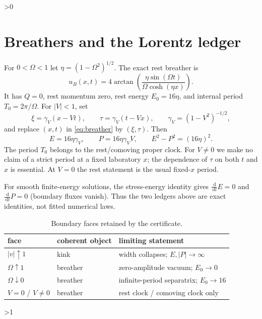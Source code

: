 \documentclass[10pt]{article}
\newcommand{\dd}{\,\mathrm d}
\begin{document}
\ifnum\CRevisionRound>0
\section{Breathers and the Lorentz ledger}
For $0<\Omega<1$ let $\eta=(1-\Omega^2)^{1/2}$.  The exact rest breather is
\begin{equation}
 u_B(x,t)=4\arctan\!\left(\frac{\eta\sin(\Omega t)}
 {\Omega\cosh(\eta x)}\right).
 \label{eq:breather}
\end{equation}
It has $Q=0$, rest momentum zero, rest energy $E_0=16\eta$, and internal
period $T_0=2\pi/\Omega$.  For $|V|<1$, set
\begin{equation}
 \xi=\gamma_V(x-Vt),\qquad \tau=\gamma_V(t-Vx),\qquad
 \gamma_V=(1-V^2)^{-1/2},
 \label{eq:boost}
\end{equation}
and replace $(x,t)$ in \eqref{eq:breather} by $(\xi,\tau)$.  Then
\begin{equation}
 E=16\eta\gamma_V,\qquad P=16\eta\gamma_VV,
 \qquad E^2-P^2=(16\eta)^2 .
 \label{eq:breatherledger}
\end{equation}
The period $T_0$ belongs to the rest/comoving proper clock.  For $V\ne0$ we
make no claim of a strict period at a fixed laboratory $x$; the dependence of
$\tau$ on both $t$ and $x$ is essential.  At $V=0$ the rest statement is the
usual fixed-$x$ period.

For smooth finite-energy solutions, the stress-energy identity gives
$\frac{\dd}{\dd t}E=0$ and $\frac{\dd}{\dd t}P=0$ (boundary fluxes vanish).
Thus the two ledgers above are exact identities, not fitted numerical laws.
\begin{table}[ht]
\centering\small
\caption{Boundary faces retained by the certificate.}
\begin{tabular}{lll}
\toprule
face & coherent object & limiting statement\\
\midrule
$|v|\uparrow1$ & kink & width collapses; $E,|P|\to\infty$\\
$\Omega\uparrow1$ & breather & zero-amplitude vacuum; $E_0\to0$\\
$\Omega\downarrow0$ & breather & infinite-period separatrix; $E_0\to16$\\
$V=0$ / $V\ne0$ & breather & rest clock / comoving clock only\\
\bottomrule
\end{tabular}
\end{table}
\fi

\ifnum\CRevisionRound>1
\end{document}
